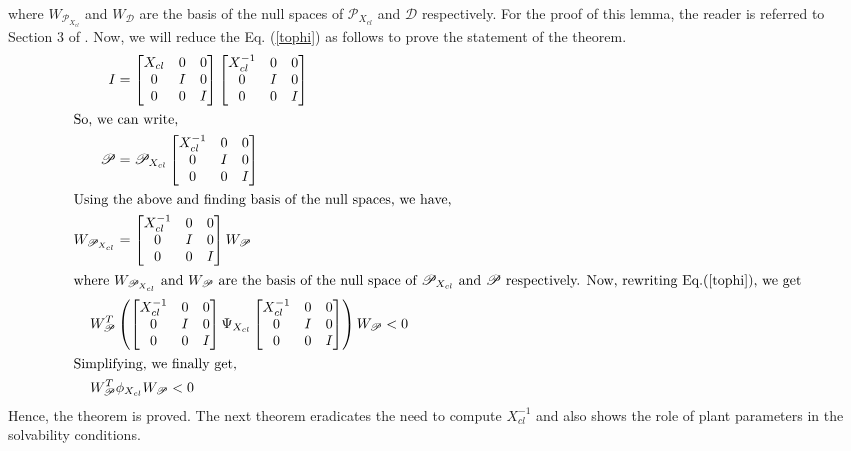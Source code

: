 \documentclass[a4paper,12pt]{article}
\begin{document}
	where  $W_{\mathscr{P}_{X_{cl}}}$ and $W_{\mathscr{D}}$ are the basis of the null spaces of $\mathscr{P}_{X_{cl}}$ and $\mathscr{D}$ respectively. For the proof of this lemma, the reader is referred to Section 3 of \cite{Pasca}.
	Now, we will reduce the Eq. (\ref{tophi}) as follows to prove the statement of the theorem.
	\begin{align*}
		I&=\begin{bmatrix}
		X_{cl} & 0 & 0 \\
		0 & I & 0 \\
		0 & 0 & I
		\end{bmatrix}
		\begin{bmatrix}
		X_{cl}^{-1} & 0 & 0 \\
		0 & I & 0 \\
		0 & 0 & I
		\end{bmatrix} \\
		\intertext{So, we can write,}
		\mathscr{P} &= \mathscr{P}_{X_{cl}}\begin{bmatrix}
		X_{cl}^{-1} & 0 & 0 \\
		0 & I & 0 \\
		0 & 0 & I
		\end{bmatrix}	\\
	\intertext{Using the above and finding basis of the null spaces, we have,}
	W_{\mathscr{P}_{X_{cl}}} &= \begin{bmatrix}
	X_{cl}^{-1} & 0 & 0 \\
		0 & I & 0 \\
		0 & 0 & I
	\end{bmatrix} W_{\mathscr{P}}\\
	\intertext{where $W_{\mathscr{P}_{X_{cl}}}$ and $ W_{\mathscr{P}}$ are the basis of the null space of $\mathscr{P}_{X_{cl}}$ and $\mathscr{P}$ respectively. Now, rewriting Eq.(\ref{tophi}), we get}
	W_{\mathscr{P}}^{T}&\left(\begin{bmatrix}
	X_{cl}^{-1} & 0 & 0 \\
		0 & I & 0 \\
		0 & 0 & I
	\end{bmatrix}
	\Psi_{X_{cl}} \begin{bmatrix}
	X_{cl}^{-1} & 0 & 0 \\
		0 & I & 0 \\
		0 & 0 & I
	\end{bmatrix}\right)
	W_{\mathscr{P}} < 0\\
	\intertext{Simplifying, we finally get,}
		W_{\mathscr{P}}^{T}&\phi_{X_{cl}}W_{\mathscr{P}} < 0
	\end{align*}		
	Hence, the theorem is proved. The next theorem eradicates the need to compute $X_{cl}^{-1}$ and also shows the role of plant parameters in the solvability conditions.
\end{document}
